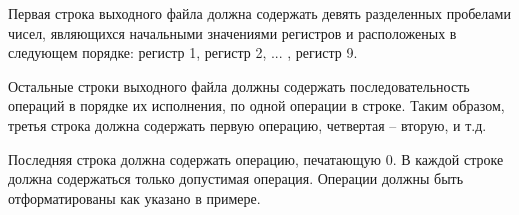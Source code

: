 Первая строка выходного файла должна содержать девять разделенных пробелами
чисел, являющихся начальными значениями регистров и расположеных в
следующем порядке: регистр 1, регистр 2, ... , регистр 9.

Остальные строки выходного файла должны содержать последовательность
операций в порядке их исполнения, по одной операции в строке. Таким образом,
третья строка должна содержать первую операцию, четвертая -- вторую, и т.д.

Последняя строка должна содержать операцию, печатающую 0. В каждой строке
должна содержаться только допустимая операция. Операции должны быть
отформатированы как указано в примере.